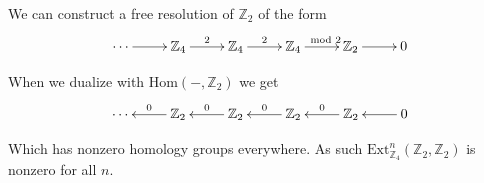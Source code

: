 \documentclass[10pt]{article}
\newcommand{\bb}[1]{\mathbb{#1}}
\newcommand{\Ext}{\mathrm{Ext}}
\newcommand{\Hom}{\mathrm{Hom}}
\theoremstyle{plain}
\theoremstyle{remark}
\begin{document}
We can construct a free resolution of $\bb{Z}_2$ of the form
\[
  \xymatrix{
    \cdots \ar[r] & \bb{Z}_4 \ar[r]^2 & \bb{Z}_4 \ar[r]^2 & \bb{Z}_4 \ar[r]^-{\mod 2} & \bb{Z}_2 \ar[r] & 0
  }
\]

When we dualize with $\Hom(-,\bb{Z}_2)$ we get
\[
  \xymatrix{
    \cdots & \bb{Z}_2 \ar[l]_0 & \bb{Z}_2 \ar[l]_0 & \bb{Z}_2 \ar[l]_0 & \bb{Z}_2 \ar[l]_0 & \ar[l] 0
  }
\]

Which has nonzero homology groups everywhere. As such $\Ext_{\bb{Z}_4}^n(\bb{Z}_2,\bb{Z}_2)$
is nonzero for all $n$.

\end{document}
